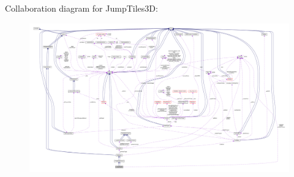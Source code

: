 Collaboration diagram for Jump\+Tiles3D\+:
\nopagebreak
\begin{figure}[H]
\begin{center}
\leavevmode
\includegraphics[width=350pt]{classJumpTiles3D__coll__graph}
\end{center}
\end{figure}
